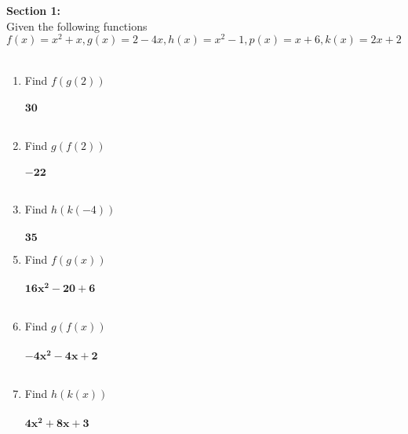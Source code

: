 \documentclass{article}
\begin{document}
\noindent
\textbf{Section 1:}
\\
Given the following functions $f(x)=x^2+x, g(x)=2-4x, h(x)=x^2-1, p(x)=x+6,k(x)=2x+2$\\
\\
\begin{minipage}[t]{0.45\textwidth}
    \begin{enumerate}
        \item Find $f(g(2))$
        \\\\
              $\mathbf{30}$
        \\\\
        \item Find $g(f(2))$
        \\\\
              $\mathbf{-22}$
        \\\\
        \item Find $h(k(-4))$
        \\\\
              $\mathbf{35}$
        
    \end{enumerate}
\end{minipage}%
\hfill
\begin{minipage}[t]{0.45\textwidth}
    \begin{enumerate}
        \setcounter{enumi}{4} %
        \item Find $f(g(x))$
        \\\\
              $\mathbf{16x^2-20+6}$
        \\\\
        \item Find $g(f(x))$
        \\\\
              $\mathbf{-4x^2-4x+2}$
        \\\\
        \item Find $h(k(x))$
        \\\\
              $\mathbf{4x^2+8x+3}$
        
    \end{enumerate}
\end{minipage}
\end{document}
